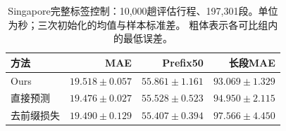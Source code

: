 \begin{table}[t]
\centering\footnotesize\setlength{\tabcolsep}{4pt}
\caption{Singapore完整标签控制：10,000趟评估行程、197,301段。单位为秒；三次初始化的均值与样本标准差。 粗体表示各可比组内的最低误差。}\label{tab:singapore}
\begin{tabular}{lrrr}\toprule
方法 & MAE & Prefix50 & 长段MAE\\\midrule
Ours & $19.518\pm0.057$ & $55.861\pm1.161$ & $\mathbf{93.069\pm1.329}$\\
直接预测 & $\mathbf{19.476\pm0.027}$ & $55.528\pm0.523$ & $94.950\pm2.115$\\
去前缀损失 & $19.490\pm0.129$ & $\mathbf{55.407\pm0.394}$ & $97.566\pm4.450$\\
\bottomrule\end{tabular}
\end{table}
